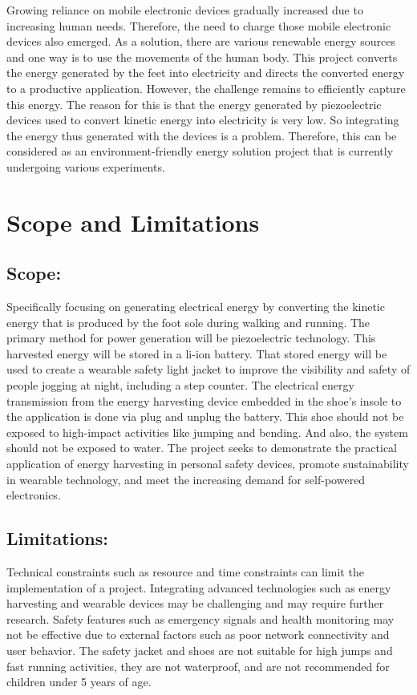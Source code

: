 \documentclass[11pt]{report}	%
\begin{document}
Growing reliance on mobile electronic devices gradually increased due to increasing human needs. Therefore, the need to charge those mobile electronic devices also emerged. As a solution, there are various renewable energy sources and one way is to use the movements of the human body.
This project converts the energy generated by the feet into electricity and directs the converted energy to a productive application. However, the challenge remains to efficiently capture this energy. The reason for this is that the energy generated by piezoelectric devices used to convert kinetic energy into electricity is very low. So integrating the energy thus generated with the devices is a problem.
Therefore, this can be considered as an environment-friendly energy solution project that is currently undergoing various experiments.
\section{Scope and Limitations}
\subsection{Scope:}
Specifically focusing on generating electrical energy by converting the kinetic energy that is produced by the foot sole during walking and running. The primary method for power generation will be piezoelectric technology. This harvested energy will be stored in a  li-ion battery. 
That stored energy will be used to create a wearable safety light jacket to improve the visibility and safety of people jogging at night, including a step counter. The electrical energy transmission from the energy harvesting device embedded in the shoe's insole to the application is done via plug and unplug the battery. This shoe should not be exposed to high-impact activities like jumping and bending. And also, the system should not be exposed to water.
The project seeks to demonstrate the practical application of energy harvesting in personal safety devices, promote sustainability in wearable technology, and meet the increasing demand for self-powered electronics.
\subsection{Limitations:}
Technical constraints such as resource and time constraints can limit the implementation of a project. Integrating advanced technologies such as energy harvesting and wearable devices may be challenging and may require further research. Safety features such as emergency signals and health monitoring may not be effective due to external factors such as poor network connectivity and user behavior. The safety jacket and shoes are not suitable for high jumps and fast running activities, they are not waterproof, and are not recommended for children under 5 years of age.
\end{document}

